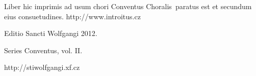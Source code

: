 \documentclass[a4paper, twoside, 12pt]{article}
\begin{document}
\begin{center}
Liber hic imprimis ad usum chori 
\guillemotright Conventus Choralis\guillemotleft\ 
paratus est
et secundum eius consuetudines.
http://www.introitus.cz

\vspace{1cm}

{\large Editio Sancti Wolfgangi 2012.}

\vspace{2mm}

Series \guillemotright Conventus\guillemotleft, vol. II.

\vspace{1cm}

http://stiwolfgangi.xf.cz

\end{center}

\vfill
\end{document}
